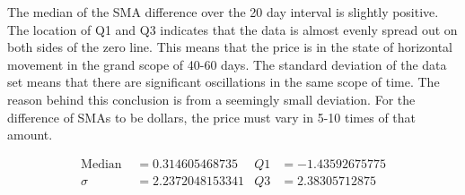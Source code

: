 \documentclass{article}
\begin{document}
\begin{figure}[h]
    \centering
\end{figure}

The median of the SMA difference over the 20 day interval is slightly positive. The location of Q1 and Q3 indicates that the data is almost evenly spread out on both sides of the zero line. This means that the price is in the state of horizontal movement in the grand scope of 40-60 days. The standard deviation of the data set means that there are significant oscillations in the same scope of time. The reason behind this conclusion is from a seemingly small deviation. For the difference of SMAs to be   dollars, the price must vary in 5-10 times of that amount.



\begin{align*}
    \text{Median }&=0.314605468735        &    Q1&=-1.43592675775\\
    \sigma&=2.2372048153341        &  Q3&=2.38305712875
\end{align*}
\end{document}
